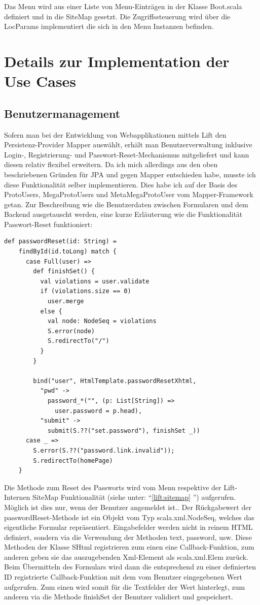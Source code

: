 Das Menu wird aus einer Liste von Menu-Eintr\"agen in der Klasse Boot.scala definiert und in die SiteMap gesetzt. Die Zugriffssteuerung wird \"uber die LocParams implementiert die sich in den Menu Instanzen befinden. 
 
 \section{Details zur Implementation der Use Cases}
 \subsection{Benutzermanagement}
Sofern man bei der Entwicklung von Webapplikationen mittels Lift den Persistenz-Provider Mapper ausw\"ahlt, erh\"alt man Benutzerverwaltung inklusive Login-, Registrierung- und Passwort-Reset-Mechanismus mitgeliefert und kann diesen relativ flexibel erweitern. Da ich mich allerdings aus den oben beschriebenen Gr\"unden f\"ur JPA und gegen Mapper entschieden habe, musste ich diese Funktionalit\"at selber implementieren. Dies habe ich auf der Basis des ProtoUsers, MegaProtoUsers und MetaMegaProtoUser vom Mapper-Framework getan. Zur Beschreibung wie die Benutzerdaten zwischen Formularen und dem Backend ausgetauscht werden, eine kurze Erl\"auterung wie die Funktionalit\"at Passwort-Reset funktioniert:

\begin{lstlisting}[caption=Implementation Funktionalit\"at Passwort-Reset]
def passwordReset(id: String) =
    findById(id.toLong) match {
      case Full(user) =>
        def finishSet() {
          val violations = user.validate
          if (violations.size == 0)
            user.merge
          else {
            val node: NodeSeq = violations
            S.error(node)
            S.redirectTo("/")
          }
        }

        bind("user", HtmlTemplate.passwordResetXhtml,
          "pwd" -> 
            password_*("", (p: List[String]) =>
              user.password = p.head),
          "submit" -> 
            submit(S.??("set.password"), finishSet _))
      case _ => 
        S.error(S.??("password.link.invalid")); 
        S.redirectTo(homePage)
    }
\end{lstlisting}
Die Methode zum Reset des Passworts wird vom Menu respektive der Lift-Internen SiteMap Funktionalit\"at (siehe unter: ``\ref{lift:sitemap} '') aufgerufen. M\"oglich ist dies nur, wenn der Benutzer angemeldet ist..  Der R\"uckgabewert der passwordReset-Methode ist ein Objekt vom Typ scala.xml.NodeSeq, welches das eigentliche Formular repr\"asentiert. Eingabefelder werden nicht in reinem HTML definiert, sondern via die Verwendung der Methoden text, password, usw. Diese Methoden der Klasse SHtml registrieren zum einen eine Callback-Funktion, zum anderen geben sie das auszugebenden Xml-Element als scala.xml.Elem zur\"uck. Beim \"Ubermitteln des Formulars wird dann die entsprechend zu einer definierten ID registrierte Callback-Funktion mit dem vom Benutzer eingegebenen Wert aufgerufen. Zum einen wird somit f\"ur die Textfelder der Wert hinterlegt, zum anderen via die Methode finishSet der Benutzer validiert und gespeichert. 

